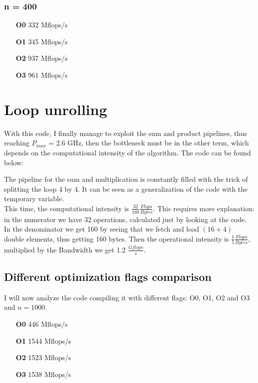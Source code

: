 \documentclass[11pt,a4paper,oneside,titlepage,openright]{book}
\begin{document}
\subsection{ n = 400}

\begin{itemize}
\item[\textbf{O0}] 332  Mflops/s
\item[\textbf{O1}] 345 Mflops/s
\item[\textbf{O2}] 937 Mflops/s
\item[\textbf{O3}] 961 Mflops/s
\end{itemize}



\chapter{Loop unrolling}
With this code, I finally manage to exploit the sum and product pipelines, thus reaching $P_{max}$ = 2.6 GHz, then the bottleneck must be in the other term, which depends on the computational intensity of the algorithm. 
The code can be found below: 


The pipeline for the sum and multiplication is constantly filled with the trick of splitting the loop 4 by 4. It can be seen as a generalization of the code with the temporary variable. \\
This time, the computational intensity is $\frac{32}{160}\frac{Flops}{Bytes}$. This requires more explanation: in the numerator we have 32 operations, calculated just by looking at the code. In the denominator we get 160 by seeing that we fetch and load $(16+4)$ double elements, thus getting 160 bytes. 
Then the operational intensity is $\frac{1}{5}\frac{Flops}{Bytes}$, multiplied by the Bandwidth we get 1.2 $\frac{Gflops}{s}$. 



\section{Different optimization flags comparison}
I will now analyze the code compiling it with different flags: O0, O1, O2 and O3 and $n = 1000$.

\begin{itemize}
\item[\textbf{O0}] 446  Mflops/s
\item[\textbf{O1}] 1544 Mflops/s
\item[\textbf{O2}] 1523 Mflops/s
\item[\textbf{O3}] 1538 Mflops/s
\end{itemize}
\end{document}
